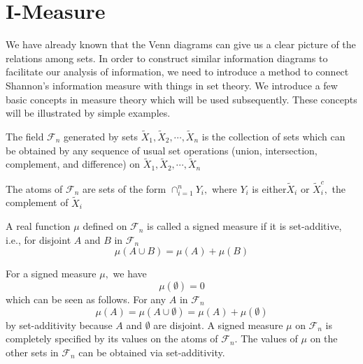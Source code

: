\section{I-Measure}
We have already known that the Venn diagrams can give us a clear picture of the relations among sets. In order to construct  similar information diagrams to facilitate our analysis of information, we need to introduce a method to connect Shannon's information measure with things in set theory. We introduce a few basic concepts in measure theory which will be used subsequently. These concepts will be illustrated by simple examples.\\

\begin{definition}[Field]\label{field}
The field $\mathcal{F}_{n}$ generated by sets $\tilde{X}_{1}, \tilde{X}_{2}, \cdots, \tilde{X}_{n}$ is the collection of sets which can be obtained by any sequence of usual set operations (union, intersection, complement, and difference) on $\tilde{X}_{1}, \tilde{X}_{2}, \cdots, \tilde{X}_{n}$\\
\end{definition}

\begin{definition}[Atom]\label{atom}
The atoms of $\mathcal{F}_{n}$ are sets of the form $\cap_{i=1}^{n} Y_{i},$ where $Y_{i}$ is either$\tilde{X}_{i}$ or $\tilde{X}_{i}^{c},$ the complement of $\tilde{X}_{i}$\\
\end{definition}

\begin{definition}\label{sm}
A real function $\mu$ defined on $\mathcal{F}_{n}$ is called a signed measure if it is set-additive, i.e., for disjoint $A$ and $B$ in $\mathcal{F}_{n}$
\begin{equation}
\mu(A \cup B)=\mu(A)+\mu(B)
\end{equation}
\end{definition}

For a signed measure $\mu,$ we have
\begin{equation}
\mu(\emptyset)=0
\end{equation}
which can be seen as follows. For any $A$ in $\mathcal{F}_{n}$
\begin{equation}
\mu(A)=\mu(A \cup \emptyset)=\mu(A)+\mu(\emptyset)
\end{equation}
by set-additivity because $A$ and $\emptyset$ are disjoint. A signed measure $\mu$ on $\mathcal{F}_{n}$ is completely specified by its values on the atoms of $\mathcal{F}_{n} .$ The values of $\mu$ on the other sets in $\mathcal{F}_{n}$ can be obtained via set-additivity.

